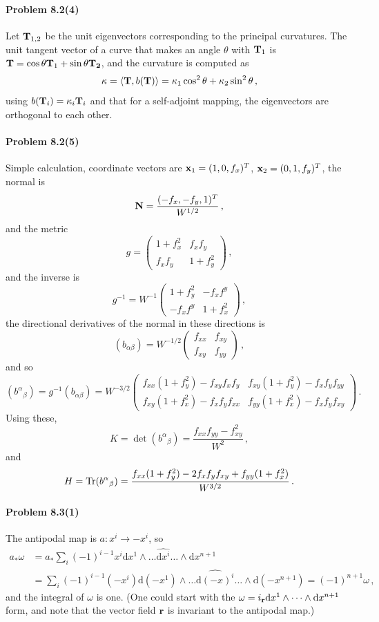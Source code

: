\documentclass[a4paper,12pt]{article}
\def\d{\mathrm{d}}
\def\Tr{\ensuremath{\mathop{\rm Tr}}}
\newcommand{\problem}[1]{\paragraph{Problem #1}}
\begin{document}
\problem{8.2(4)} Let ${\bf T}_{1, 2}$ be the unit eigenvectors corresponding to the principal curvatures. The unit tangent vector of a curve that makes an angle $\theta$ with ${\bf T}_1$ is ${\bf T}=\cos\theta {\bf T}_1 + \sin\theta{\bf T_2}$, and the curvature is computed as
\[
 \kappa = \langle {\bf T}, b({\bf T})\rangle = \kappa_1 \cos^2\theta + \kappa_2 \sin^2\theta\,,
\]
using $b({\bf T}_i)=\kappa_i {\bf T}_i$ and that for a self-adjoint mapping, the eigenvectors are orthogonal to each other.


\problem{8.2(5)} Simple calculation, coordinate vectors are ${\bf x}_1=(1, 0, f_x)^T$, ${\bf x}_2=(0, 1, f_y)^T$, the normal is
\[
 {\bf N} = \frac{(-f_x,-f_y,1)^T}{W^{1/2}}\,,
\]
and the metric
\[
 g = \begin{pmatrix} 1+f_x^2 & f_x f_y \\ f_x f_y & 1+f_y^2 \end{pmatrix}\,,
\]
and the inverse is
\[
 g^{-1} = W^{-1}\begin{pmatrix}1+f_y^2 & -f_x f^y \\ -f_x f^y & 1+f_x^2\end{pmatrix}\,,
\]
the directional derivatives of the normal in these directions is
\[
 (b_{\alpha\beta}) = W^{-1/2}\begin{pmatrix}f_{xx} & f_{xy} \\ f_{xy} & f_{yy}\end{pmatrix}\,,
\]
and so
\[
 (b^\alpha{}_\beta) = g^{-1}(b_{\alpha\beta}) = W^{-3/2}\begin{pmatrix}
 f_{xx}(1+f_y^2) -f_{xy}f_x f_y & f_{xy}(1+f_y^2)-f_x f_y f_{yy} \\
 f_{xy}(1+f_x^2)-f_x f_y f_{xx} & f_{yy}                                                         (1+f_x^2) -f_x f_y f_{xy}
 \end{pmatrix}\,.
\]
Using these,
\[
 K = \det (b^\alpha{}_\beta) = \frac{f_{xx}f_{yy}-f_{xy}^2}{W^2}\,,
\]
and
\[
 H = \Tr (b^\alpha{}_\beta) = \frac{f_{xx}(1+f_y^2)-2 f_x f_y f_{xy}+f_{yy}(1+f_x^2)}{W^{3/2}}\,.
\]


\problem{8.3(1)} The antipodal map is $a: x^i\to -x^i$, so
\[\begin{aligned}
 a_* \omega &= a_* \sum_i (-1)^{i-1}x^i \d x^1\wedge\dots \hat{\d x^i}\dots\wedge\d x^{n+1}\\ &= \sum_i (-1)^{i-1} (-x^i)\d (-x^1) \wedge\dots \widehat{\d (-x)^i}\dots\wedge \d(-x^{n+1}) = (-1)^{n+1}\omega\,,
\end{aligned}\]
and the integral of $\omega$ is one. (One could start with the $\omega = i_{\bf r}\d x^1\wedge\dots\wedge \d x^{n+1}$ form, and note that the vector field ${\bf r}$ is invariant to the antipodal map.)
\end{document}
